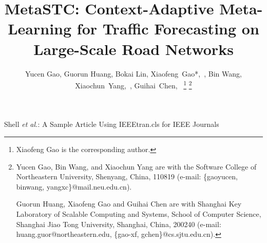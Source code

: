 \documentclass[lettersize,journal]{IEEEtran}
\begin{document}
\title{MetaSTC: Context-Adaptive Meta-Learning for Traffic Forecasting on Large-Scale Road Networks}

\author{Yucen Gao,
        Guorun Huang,
        Bokai Lin,
        Xiaofeng~Gao*,~, %
        Bin Wang,
        Xiaochun~Yang,~,
        Guihai~Chen,~%
\thanks{Xiaofeng Gao is the corresponding author.}
\thanks{Yucen Gao, Bin Wang, and Xiaochun Yang are with the Software College of Northeastern University, Shenyang, China, 110819 (e-mail: \{gaoyucen, binwang, yangxc\}@mail.neu.edu.cn).

Guorun Huang, Xiaofeng Gao and Guihai Chen are with Shanghai Key Laboratory of Scalable Computing and Systems, School of Computer Science, Shanghai Jiao Tong University, Shanghai, China, 200240 (e-mail: huang.guor@northeastern.edu, \{gao-xf, gchen\}@cs.sjtu.edu.cn).

}
}

%
{Shell \MakeLowercase{\textit{et al.}}: A Sample Article Using IEEEtran.cls for IEEE Journals}


\maketitle
\end{document}
